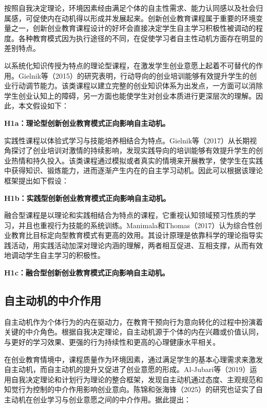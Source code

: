 按照自我决定理论，环境因素经由满足个体的自主性需求、能力认同感以及社会归属感，可促使内在动机得以形成并发展起来。创新创业教育课程属于重要的环境变量之一，创新创业教育课程设计的好坏会直接决定学生自主学习积极性被调动的程度。各种教育模式因为执行途径的不同，在促使学习者自主性动机方面存在明显的差别特点。

以系统化知识传授为特点的理论型课程，在激发学生创业意愿上起着不可替代的作用。Gielnik等\nolinebreak[3]（2015）的研究表明，行动导向的创业培训能够有效提升学生的创业行动调节能力\cite{Gielnik2015}。该类课程以建立完整的创业知识体系为出发点，一方面可以消除学生创业认知上的障碍，另一方面也能使学生对创业本质进行更深层次的理解。因此，本文假设如下：

\textbf{H1a：理论型创新创业教育模式正向影响自主动机。}

实践性课程以体验式学习与技能培养相结合为特点。Gielnik等\nolinebreak[3]（2017）从长期视角探讨了创业培训对激情的持续影响，发现实践导向的培训能够有效提升学生的创业热情和持久投入\cite{Gielnik2017}。该类课程通过模拟或者真实的情境来开展教学，使学生在实践中获得知识、锻炼能力，进而逐渐产生内在的自主学习动机。因此可以根据该理论框架提出如下假设：

\textbf{H1b：实践型创新创业教育模式正向影响自主动机。}

融合型课程是以理论和实践相结合为特点的课程，它重视认知领域预习性质的学习，并且也重视行为技能的系统训练。Manimala和Thomas\nolinebreak[3]（2017）认为综合性创业教育比目标定向型教育模式有更高的效用\cite{Manimala2017}。其设计原理是依靠科学的理论指导实践活动，用实践活动加深对理论内涵的理解，两者相互促进、互相支撑，从而有效地调动学生自主学习的积极性。

\textbf{H1c：融合型创新创业教育模式正向影响自主动机。}

\subsection{自主动机的中介作用}

自主动机作为个体行为的内在驱动力，在教育干预向行为意向转化的过程中扮演着关键的中介角色。根据自我决定理论，自主动机源于个体的内在兴趣或价值认同，与更好的学习效果、更强的行为持续性和更高的心理健康水平相关。

在创业教育情境中，课程质量作为环境因素，通过满足学生的基本心理需求来激发自主动机，而自主动机的提升又促进了创业意愿的形成。Al-Jubari等\nolinebreak[3]（2019）运用自我决定理论和计划行为理论的整合框架，发现自主动机通过态度、主观规范和知觉行为控制的中介作用影响创业意向\cite{AlJubari2019}。陈锦和张海锋\nolinebreak[3]（2025）的研究也证实了自主动机在创业学习与创业意愿之间的中介作用\cite{chenjin2025}。据此提出：

